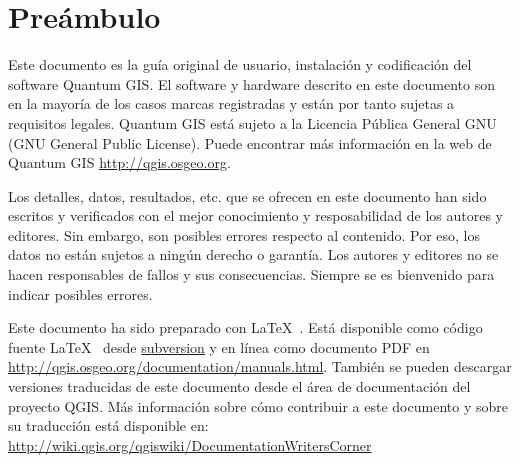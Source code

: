 
\newcommand\qgistip[1]{\raggedright\small{#1}}
\renewcommand{\topfraction}{0.85}
\renewcommand{\textfraction}{0.1}
\renewcommand{\floatpagefraction}{0.75}

\thispagestyle{empty}



\section*{Preámbulo}

\vspace{1cm}


Este documento es la guía original de usuario, instalación y codificación del 
software Quantum GIS. El software y hardware descrito en este  
documento son en la mayoría de los casos marcas registradas y están por tanto sujetas  
a requisitos legales. Quantum GIS está sujeto a la Licencia Pública General GNU (GNU General Public 
License). Puede encontrar más información en la web de Quantum GIS
\url{http://qgis.osgeo.org}.

Los detalles, datos, resultados, etc. que se ofrecen en este documento han sido 
escritos y verificados con el mejor conocimiento y resposabilidad de los autores y
editores. Sin embargo, son posibles errores respecto al contenido. 
Por eso, los datos no están sujetos a ningún derecho o garantía. Los autores y editores 
no se hacen responsables de fallos y 
sus consecuencias. Siempre se es bienvenido para indicar posibles errores.

Este documento ha sido preparado con \LaTeX~. Está disponible como código fuente \LaTeX~
desde \href{http://wiki.qgis.org/qgiswiki/DocumentationWritersCorner}{subversion} 
y en línea como documento PDF en \url{http://qgis.osgeo.org/documentation/manuals.html}. 
También se pueden descargar versiones traducidas de este documento desde el área de documentación 
del proyecto QGIS. Más información sobre cómo contribuir a este documento y sobre 
su traducción está disponible en: \url{http://wiki.qgis.org/qgiswiki/DocumentationWritersCorner} 

